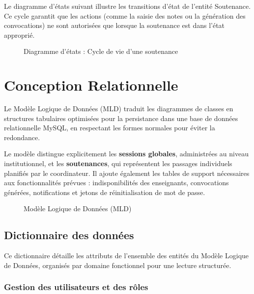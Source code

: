 \documentclass[12pt,a4paper]{article}
\begin{document}
Le diagramme d'états suivant illustre les transitions d'état de l'entité Soutenance. Ce cycle garantit que les actions (comme la saisie des notes ou la génération des convocations) ne sont autorisées que lorsque la soutenance est dans l'état approprié.

\begin{figure}[H]
    \centering
    \caption{Diagramme d'états : Cycle de vie d'une soutenance}
\end{figure}

\newpage
\section{Conception Relationnelle}
\label{sec:relationnelle}

Le Modèle Logique de Données (MLD) traduit les diagrammes de classes en structures tabulaires optimisées pour la persistance dans une base de données relationnelle MySQL, en respectant les formes normales pour éviter la redondance.

Le modèle distingue explicitement les \textbf{sessions globales}, administrées au niveau institutionnel, et les \textbf{soutenances}, qui représentent les passages individuels planifiés par le coordinateur. Il ajoute également les tables de support nécessaires aux fonctionnalités prévues : indisponibilités des enseignants, convocations générées, notifications et jetons de réinitialisation de mot de passe.

\begin{figure}[H]
    \centering
    \caption{Modèle Logique de Données (MLD)}
\end{figure}

\subsection{Dictionnaire des données}
\label{subsec:dictionnaire}

Ce dictionnaire détaille les attributs de l'ensemble des entités du Modèle Logique de Données, organisés par domaine fonctionnel pour une lecture structurée.

\subsubsection{Gestion des utilisateurs et des rôles}
\end{document}
